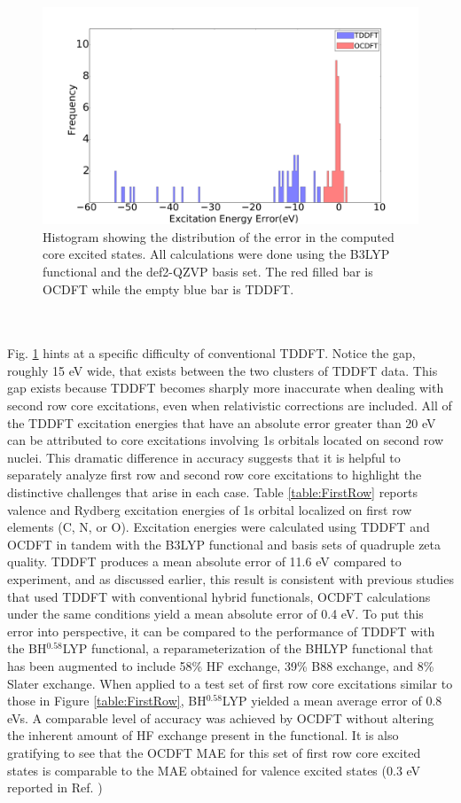 \documentclass[12pt]{article}
\begin{document}
\begin{figure}[!ht]
\centering
\includegraphics[scale=0.30]{NEW_histogram.png}
\caption{Histogram showing the distribution of the error in the computed core excited states. All calculations were done using the B3LYP functional and the def2-QZVP basis set. The red filled bar is OCDFT while the empty blue bar is TDDFT.}
\label{figure:Hist}
\end{figure}
\\ \\
Fig. \ref{figure:Hist} hints at a specific difficulty of conventional TDDFT. Notice the gap, roughly 15 eV wide, that exists between the two clusters of TDDFT data. This gap exists because TDDFT becomes sharply more inaccurate when dealing with second row core excitations, even when relativistic corrections are included. All of the TDDFT excitation energies that have an absolute error greater than 20 eV can be attributed to core excitations involving 1s orbitals located on second row nuclei. This dramatic difference in accuracy suggests that it is helpful to separately analyze first row and second row core excitations to highlight the distinctive challenges that arise in each case.
\noindent Table \ref{table:FirstRow} reports valence and Rydberg excitation energies of 1s orbital localized on first row elements (C, N, or O). Excitation energies were calculated using TDDFT and OCDFT in tandem with the B3LYP functional and basis sets of quadruple zeta quality. TDDFT produces a mean absolute error of 11.6 eV compared to experiment, and as discussed earlier, this result is consistent with previous studies that used TDDFT with conventional hybrid functionals,\cite{besley_self-consistent-field_2009} OCDFT calculations under the same conditions yield a mean absolute error of 0.4 eV. To put this error into perspective, it can be compared to the performance of TDDFT with the BH$^{0.58}$LYP functional,\cite{besley_time-dependent_2009} a reparameterization of the BHLYP functional that has been augmented to include 58\% HF exchange, 39\% B88 exchange, and 8\% Slater exchange. When applied to a test set of first row core excitations similar to those in Figure \ref{table:FirstRow}, BH$^{0.58}$LYP yielded a mean average error of 0.8 eVs. A comparable level of accuracy was achieved by OCDFT without altering the inherent amount of HF exchange present in the functional. It is also gratifying to see that the OCDFT MAE for this set of first row core excited states is comparable to the MAE obtained for valence excited states (0.3 eV reported in Ref. )
\end{document}

